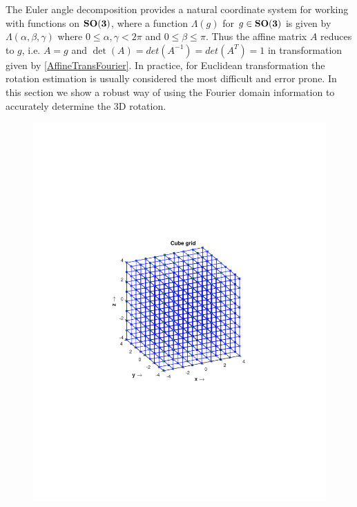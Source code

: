 \documentclass{UCF_ETD}
\begin{document}
The Euler angle decomposition provides a natural coordinate system for working with functions on ${\bf SO(3)} $, where a function $\Lambda(g)$ for $g\in {\bf SO(3)} $ is given by $\Lambda(\alpha, \beta,\gamma)$ where $0 \leq \alpha, \gamma < 2\pi$ and $0 \leq \beta \leq \pi$. Thus the affine matrix $A$ reduces to $g$, i.e. $A = g$ and $\det(A) = det(A^{-1})=det(A^T) = 1$ in transformation given by \eqref{AffineTransFourier}. In practice, for Euclidean transformation the rotation estimation is usually considered the most difficult and error prone. In this section we show a robust way of using the Fourier domain information to accurately determine the $3$D rotation. 

\begin{figure}[H]
\begin{center}
\includegraphics[scale=0.7]{RobustRegistration/CubeGrid}

\end{center}
\end{figure}
\end{document}
